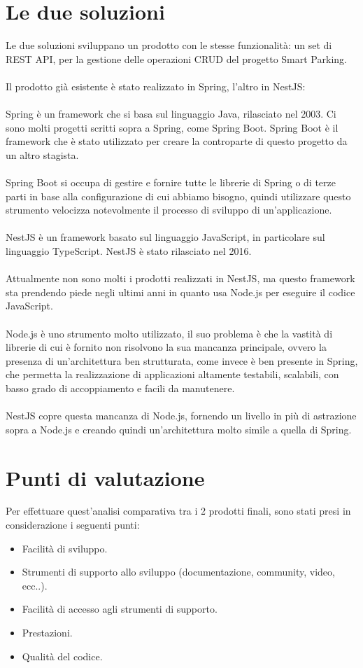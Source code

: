 \section{Le due soluzioni}
Le due soluzioni sviluppano un prodotto con le stesse funzionalità: un set di REST API, per la gestione delle operazioni CRUD del
progetto Smart Parking.
\\\\
Il prodotto già esistente è stato realizzato in Spring, l'altro in NestJS:
\\\\
Spring è un framework che si basa sul linguaggio Java, rilasciato nel 2003. Ci sono molti progetti scritti
sopra a Spring, come Spring Boot. Spring Boot è il framework che è stato utilizzato per creare la controparte 
di questo progetto da un altro stagista.
\\\\
Spring Boot si occupa di gestire
e fornire tutte le librerie di Spring o di terze parti in base alla configurazione di cui abbiamo bisogno, quindi 
utilizzare questo strumento velocizza notevolmente il processo di sviluppo di un'applicazione.
\\\\
NestJS è un framework basato sul linguaggio JavaScript, in particolare sul linguaggio TypeScript. NestJS è
stato rilasciato nel 2016.
\\\\
Attualmente non sono molti i prodotti realizzati in NestJS, ma questo framework sta prendendo piede negli ultimi anni in quanto
usa Node.js per eseguire il codice JavaScript.
\\\\
Node.js è uno strumento molto utilizzato, il suo problema è che la vastità di librerie di cui è fornito non 
risolvono la sua mancanza principale, ovvero la presenza di un'architettura ben strutturata, come invece è ben presente in Spring, che 
permetta la realizzazione di applicazioni altamente testabili, scalabili, con basso grado di accoppiamento
e facili da manutenere.
\\\\
NestJS copre questa mancanza di Node.js, fornendo un livello in più di astrazione sopra a Node.js e creando quindi un'architettura 
molto simile a quella di Spring.

\section{Punti di valutazione}
Per effettuare quest'analisi comparativa tra i 2 prodotti finali, sono stati presi in considerazione i seguenti 
punti:
\begin{itemize}
    \item Facilità di sviluppo.
    \item Strumenti di supporto allo sviluppo (documentazione, community, video, ecc..).
    \item Facilità di accesso agli strumenti di supporto.
    \item Prestazioni.
    \item Qualità del codice.
\end{itemize}

